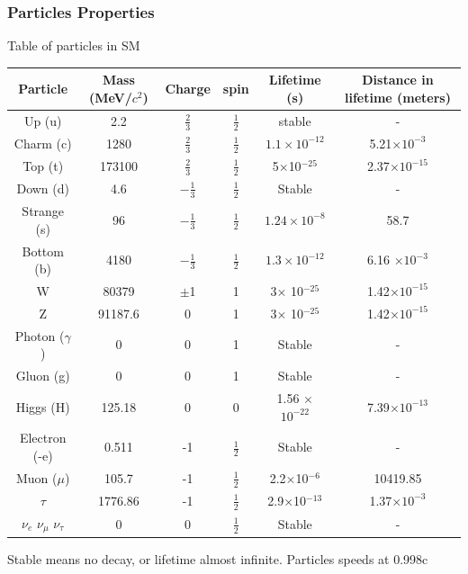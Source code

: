 \documentclass[11pt]{beamer}
\begin{document}
\begin{frame}
\frametitle{Particles Properties}
Table of particles in SM
\begin{table}
\tiny{\renewcommand{\arraystretch}{1.5}
\begin{tabular}{|c|c|c|c|c|c|}
	\hline 
Particle	&Mass (MeV/$c^2$)  &Charge  & spin &Lifetime (s)  & Distance in lifetime (meters) \\ 
	\hline 
Up (u)	& 2.2 & $\frac{2}{3}$ & $\frac{1}{2}$ & stable &  -\\ 
	\hline 
Charm (c)	& 1280 &$\frac{2}{3}$  &  $\frac{1}{2}$ & $ 1.1 \times 10^{-12}$ &  5.21$\times 10^{-3}$ \\ 
	\hline 
Top	(t)& 173100 & $\frac{2}{3}$ & $\frac{1}{2}$  & 5$\times$10$^{-25}$ &2.37$\times 10^{-15}$   \\ 
	\hline 
Down (d)	& 4.6 &$-\frac{1}{3}$  & $\frac{1}{2}$  & Stable & - \\ 
	\hline 
Strange (s)	& 96 &$-\frac{1}{3}$  & $\frac{1}{2}$  &$1.24 \times 10^{-8}$  & 58.7 \\ 
	\hline 
Bottom (b)	& 4180 &$-\frac{1}{3}$  &  $\frac{1}{2}$ &$1.3 \times 10^{-12}$   & 6.16 $\times 10^{-3}$\\ 
	\hline 
W 	& 80379 &$\pm$1  & 1 & 3$\times$ 10$^{-25}$ &  1.42$\times 10^{-15}$\\ 
	\hline 
Z & 91187.6 &0  & 1 & 3$\times$ 10$^{-25}$  &1.42$\times 10^{-15}$ \\ 
\hline
Photon ($\gamma$) & 0 &0  &  1&Stable  & - \\ 
\hline
Gluon (g)	& 0 &0  &  1&Stable  & - \\ 
	\hline 
Higgs (H)	& 125.18 &0  &  0& 1.56 $\times$ $10^{-22}$ & 7.39$\times 10^{-13}$ \\ 
	\hline 
Electron (-e)& 0.511 & -1 &   $\frac{1}{2}$& Stable & - \\ 
	\hline 
Muon ($\mu$)	& 105.7 & -1  &  $\frac{1}{2}$ & 2.2$\times$10$^{-6}$ & 10419.85 \\ 
	\hline 
$\tau$	& 1776.86 &-1  &  $\frac{1}{2}$ & 2.9$\times$10$^{-13}$ & 1.37$\times 10^{-3}$\\ 
	\hline 
$\nu_e$	$\nu_\mu$ $\nu_\tau$& 0 & 0 &  $\frac{1}{2}$ & Stable &  -\\ 
	\hline 
\end{tabular} 
}
\end{table}
\tiny{Stable means no decay, or lifetime almost infinite. Particles speeds at 0.998c}
\end{frame}
\end{document}

